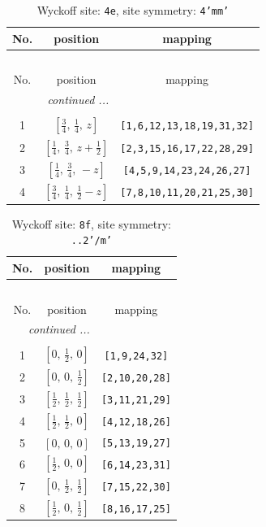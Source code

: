 \documentclass[fleqn,8pt]{jsarticle}
\begin{document}
\renewcommand{\arraystretch}{1.2}
\begin{longtable}{ccc}
\caption{Wyckoff site: {\tt 4e}, site symmetry: {\tt 4'mm'}}
 \\
 \hline \hline
No. & position & mapping \\ \hline \endfirsthead

\multicolumn{2}{l}{\tablename\ \thetable{}} \\
 \hline \hline
No. & position & mapping \\ \hline \endhead

 \hline \hline
\multicolumn{2}{r}{\footnotesize\it continued ...} \\ \endfoot

 \hline \hline
\multicolumn{2}{r}{} \\ \endlastfoot

1 & $\left[ \frac{3}{4},\, \frac{1}{4},\, z \right]$ & {\tt [1,6,12,13,18,19,31,32]} \\ \hline
2 & $\left[ \frac{1}{4},\, \frac{3}{4},\, z + \frac{1}{2} \right]$ & {\tt [2,3,15,16,17,22,28,29]} \\ \hline
3 & $\left[ \frac{1}{4},\, \frac{3}{4},\, - z \right]$ & {\tt [4,5,9,14,23,24,26,27]} \\ \hline
4 & $\left[ \frac{3}{4},\, \frac{1}{4},\, \frac{1}{2} - z \right]$ & {\tt [7,8,10,11,20,21,25,30]} \\
\end{longtable}
\renewcommand{\arraystretch}{1.2}
\begin{longtable}{ccc}
\caption{Wyckoff site: {\tt 8f}, site symmetry: {\tt ..2'/m'}}
 \\
 \hline \hline
No. & position & mapping \\ \hline \endfirsthead

\multicolumn{2}{l}{\tablename\ \thetable{}} \\
 \hline \hline
No. & position & mapping \\ \hline \endhead

 \hline \hline
\multicolumn{2}{r}{\footnotesize\it continued ...} \\ \endfoot

 \hline \hline
\multicolumn{2}{r}{} \\ \endlastfoot

1 & $\left[ 0,\, \frac{1}{2},\, 0 \right]$ & {\tt [1,9,24,32]} \\ \hline
2 & $\left[ 0,\, 0,\, \frac{1}{2} \right]$ & {\tt [2,10,20,28]} \\ \hline
3 & $\left[ \frac{1}{2},\, \frac{1}{2},\, \frac{1}{2} \right]$ & {\tt [3,11,21,29]} \\ \hline
4 & $\left[ \frac{1}{2},\, \frac{1}{2},\, 0 \right]$ & {\tt [4,12,18,26]} \\ \hline
5 & $\left[ 0,\, 0,\, 0 \right]$ & {\tt [5,13,19,27]} \\ \hline
6 & $\left[ \frac{1}{2},\, 0,\, 0 \right]$ & {\tt [6,14,23,31]} \\ \hline
7 & $\left[ 0,\, \frac{1}{2},\, \frac{1}{2} \right]$ & {\tt [7,15,22,30]} \\ \hline
8 & $\left[ \frac{1}{2},\, 0,\, \frac{1}{2} \right]$ & {\tt [8,16,17,25]} \\
\end{longtable}
\end{document}

